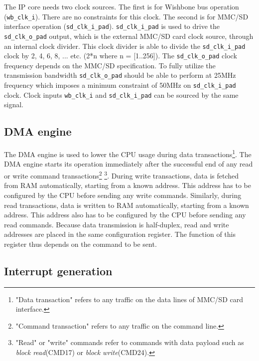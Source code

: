     The IP core needs two clock sources. The first is for Wishbone bus operation (\texttt{wb\_clk\_i}). There are no constraints for this clock. 
    The second is for MMC/SD interface operation (\texttt{sd\_clk\_i\_pad}). 
    \texttt{sd\_clk\_i\_pad} is used to drive the \texttt{sd\_clk\_o\_pad} output, which is the external MMC/SD card clock source, through an internal
    clock divider. This clock divider is able to divide the \texttt{sd\_clk\_i\_pad} clock by 2, 4, 6, 8, ... etc. (2*n where n = [1..256]).
    The \texttt{sd\_clk\_o\_pad} clock frequency depends on the MMC/SD specification. To fully utilize the transmission bandwidth \texttt{sd\_clk\_o\_pad}
    should be able to perform at 25MHz frequency which imposes a minimum constraint of 50MHz on \texttt{sd\_clk\_i\_pad} clock. 
    Clock inputs \texttt{wb\_clk\_i} and \texttt{sd\_clk\_i\_pad} can be sourced by the same signal.
    
    \subsection{DMA engine}
    \label{sec:dma}
    
    The DMA engine is used to lower the CPU usage during data transactions\footnote{"Data transaction" refers to any traffic on the data lines of MMC/SD card interface.}.
    The DMA engine starts its operation immediately after the successful end of any read or write command transactions\footnote{"Command transaction" refers to any traffic on the command line.}
    \footnote{"Read" or "write" commands refer to commands with data payload such as \textit{block read}(CMD17) or \textit{block write}(CMD24).}.
    During write transactions, data is fetched from RAM automatically, starting from a known address. This address has to be configured by the CPU before sending any write commands. 
    Similarly, during read transactions, data is written to RAM automatically, starting from a known address. 
    This address also has to be configured by the CPU before sending any read commands. Because data transmission is half-duplex, 
    read and write addresses are placed in the same configuration register. The function of this register thus depends on the command to be sent.
    
    \subsection{Interrupt generation}
    \label{sec:interrupt}
    
